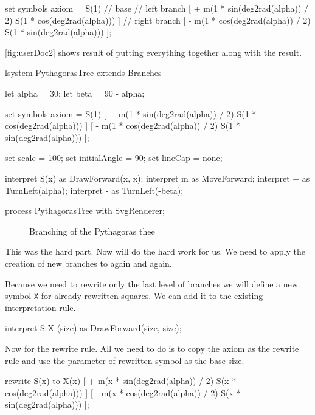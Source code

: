 \begin{Lsystem}
set symbols axiom = S(1) // base
	 // left branch
	[ + m(1 * sin(deg2rad(alpha)) / 2) S(1 * cos(deg2rad(alpha))) ]
	 // right branch
	[ - m(1 * cos(deg2rad(alpha)) / 2) S(1 * sin(deg2rad(alpha))) ];
\end{Lsystem}

\autoref{fig:userDoc2} shows result of putting everything together along with the result.

\newsavebox{\lstBoxUserDocB}
\begin{lrbox}{\lstBoxUserDocB}
\begin{Lsystem60}
lsystem PythagorasTree extends Branches{
	let alpha = 30;
	let beta = 90 - alpha;

	set symbols axiom = S(1)
	[ + m(1 * sin(deg2rad(alpha)) / 2)
		S(1 * cos(deg2rad(alpha))) ]
	[ - m(1 * cos(deg2rad(alpha)) / 2) 
		S(1 * sin(deg2rad(alpha))) ];
	
	set scale = 100;
	set initialAngle = 90;
	set lineCap = none;
	
	interpret S(x) as DrawForward(x, x);
	interpret m as MoveForward;
	interpret + as TurnLeft(alpha);
	interpret - as TurnLeft(-beta);
}
process PythagorasTree with SvgRenderer;
\end{Lsystem60}
\end{lrbox}

\begin{figure}[h!]
	\subfloat{
		\usebox{\lstBoxUserDocB}
	} \hfill
	\caption{Branching of the Pythagoras thee}
	\label{fig:userDoc2}
\end{figure}

This was the hard part.
Now \lsystems will do the hard work for us.
We need to apply the creation of new branches to again and again.

Because we need to rewrite only the last level of branches we will define a new symbol \texttt{X} for already rewritten squares.
We can add it to the existing interpretation rule.

\begin{Lsystem}
interpret S X (size) as DrawForward(size, size);
\end{Lsystem}

Now for the rewrite rule.
All we need to do is to copy the axiom as the rewrite rule and use the parameter of rewritten symbol as the base size.

\begin{Lsystem}
rewrite S(x) to X(x)
	[ + m(x * sin(deg2rad(alpha)) / 2) S(x * cos(deg2rad(alpha))) ]
	[ - m(x * cos(deg2rad(alpha)) / 2) S(x * sin(deg2rad(alpha))) ];
\end{Lsystem}

